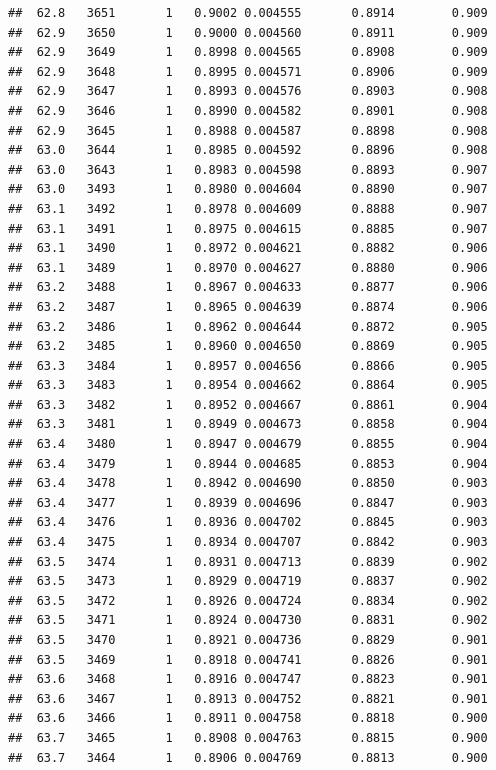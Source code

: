 \documentclass[
]{book}
\begin{document}
\begin{verbatim}
##  62.8   3651       1   0.9002 0.004555       0.8914        0.909
##  62.9   3650       1   0.9000 0.004560       0.8911        0.909
##  62.9   3649       1   0.8998 0.004565       0.8908        0.909
##  62.9   3648       1   0.8995 0.004571       0.8906        0.909
##  62.9   3647       1   0.8993 0.004576       0.8903        0.908
##  62.9   3646       1   0.8990 0.004582       0.8901        0.908
##  62.9   3645       1   0.8988 0.004587       0.8898        0.908
##  63.0   3644       1   0.8985 0.004592       0.8896        0.908
##  63.0   3643       1   0.8983 0.004598       0.8893        0.907
##  63.0   3493       1   0.8980 0.004604       0.8890        0.907
##  63.1   3492       1   0.8978 0.004609       0.8888        0.907
##  63.1   3491       1   0.8975 0.004615       0.8885        0.907
##  63.1   3490       1   0.8972 0.004621       0.8882        0.906
##  63.1   3489       1   0.8970 0.004627       0.8880        0.906
##  63.2   3488       1   0.8967 0.004633       0.8877        0.906
##  63.2   3487       1   0.8965 0.004639       0.8874        0.906
##  63.2   3486       1   0.8962 0.004644       0.8872        0.905
##  63.2   3485       1   0.8960 0.004650       0.8869        0.905
##  63.3   3484       1   0.8957 0.004656       0.8866        0.905
##  63.3   3483       1   0.8954 0.004662       0.8864        0.905
##  63.3   3482       1   0.8952 0.004667       0.8861        0.904
##  63.3   3481       1   0.8949 0.004673       0.8858        0.904
##  63.4   3480       1   0.8947 0.004679       0.8855        0.904
##  63.4   3479       1   0.8944 0.004685       0.8853        0.904
##  63.4   3478       1   0.8942 0.004690       0.8850        0.903
##  63.4   3477       1   0.8939 0.004696       0.8847        0.903
##  63.4   3476       1   0.8936 0.004702       0.8845        0.903
##  63.4   3475       1   0.8934 0.004707       0.8842        0.903
##  63.5   3474       1   0.8931 0.004713       0.8839        0.902
##  63.5   3473       1   0.8929 0.004719       0.8837        0.902
##  63.5   3472       1   0.8926 0.004724       0.8834        0.902
##  63.5   3471       1   0.8924 0.004730       0.8831        0.902
##  63.5   3470       1   0.8921 0.004736       0.8829        0.901
##  63.5   3469       1   0.8918 0.004741       0.8826        0.901
##  63.6   3468       1   0.8916 0.004747       0.8823        0.901
##  63.6   3467       1   0.8913 0.004752       0.8821        0.901
##  63.6   3466       1   0.8911 0.004758       0.8818        0.900
##  63.7   3465       1   0.8908 0.004763       0.8815        0.900
##  63.7   3464       1   0.8906 0.004769       0.8813        0.900

\end{verbatim}
\end{document}
